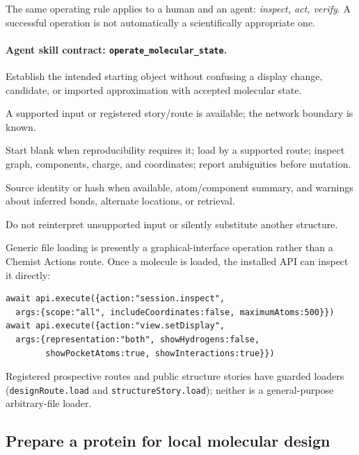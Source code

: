 \begin{small}
The same operating rule applies to a human and an agent: \emph{inspect, act, verify}. A successful operation is not automatically a scientifically appropriate one.

\paragraph{Agent skill contract: \texttt{operate\_molecular\_state}.}

\begin{description}[leftmargin=2.2cm,style=nextline]
\item[Goal] Establish the intended starting object without confusing a display change, candidate, or imported approximation with accepted molecular state.
\item[Preconditions] A supported input or registered story/route is available; the network boundary is known.
\item[Procedure] Start blank when reproducibility requires it; load by a supported route; inspect graph, components, charge, and coordinates; report ambiguities before mutation.
\item[Evidence] Source identity or hash when available, atom/component summary, and warnings about inferred bonds, alternate locations, or retrieval.
\item[Stop] Do not reinterpret unsupported input or silently substitute another structure.
\end{description}

Generic file loading is presently a graphical-interface operation rather than a Chemist Actions route. Once a molecule is loaded, the installed API can inspect it directly:

\begin{lstlisting}
await api.execute({action:"session.inspect",
  args:{scope:"all", includeCoordinates:false, maximumAtoms:500}})
await api.execute({action:"view.setDisplay",
  args:{representation:"both", showHydrogens:false,
        showPocketAtoms:true, showInteractions:true}})
\end{lstlisting}

Registered prospective routes and public structure stories have guarded loaders (\texttt{designRoute.load} and \texttt{structureStory.load}); neither is a general-purpose arbitrary-file loader.

\subsection{Prepare a protein for local molecular design}\label{appB:prepare}


\end{small}
